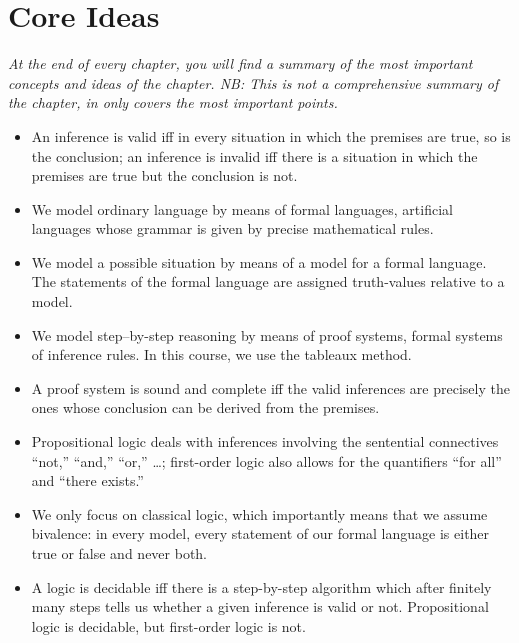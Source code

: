 \section{Core Ideas}

\emph{At the end of every chapter, you will find a summary of the most important concepts and ideas of the chapter. NB: This is not a comprehensive summary of the chapter, in only covers the most important points.}

	\begin{itemize}

		\item An inference is valid iff in every situation in which the premises are true, so is the conclusion; an inference is invalid iff there is a situation in which the premises are true but the conclusion is not.
		
		\item We model ordinary language by means of formal languages, artificial languages whose grammar is given by precise mathematical rules.
		
		\item We model a possible situation by means of a model for a formal language. The statements of the formal language are assigned truth-values relative to a model.
		
		\item We model step--by-step reasoning by means of proof systems, formal systems of inference rules. In this course, we use the tableaux method.
		
		\item A proof system is sound and complete iff the valid inferences are precisely the ones whose conclusion can be derived from the premises.
		
		\item Propositional logic deals with inferences involving the sentential connectives ``not,'' ``and,'' ``or,'' \dots; first-order logic also allows for the quantifiers ``for all'' and ``there exists.''
		
		\item We only focus on classical logic, which importantly means that we assume bivalence: in every model, every statement of our formal language is either true or false and never both.
		
		\item A logic is decidable iff there is a step-by-step algorithm which after finitely many steps tells us whether a given inference is valid or not. Propositional logic is decidable, but first-order logic is not.

	\end{itemize}
	
